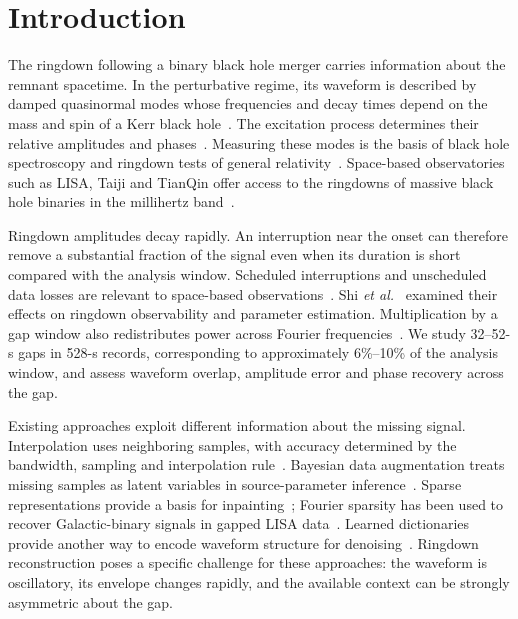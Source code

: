 \documentclass[10pt,prd,aps,a4paper,twocolumn,superscriptaddress,nofootinbib,floatfix]{revtex4-2}
\begin{document}
\section{Introduction}
The ringdown following a binary black hole merger carries information about the remnant spacetime. In the perturbative regime, its waveform is described by damped quasinormal modes whose frequencies and decay times depend on the mass and spin of a Kerr black hole~\cite{berti2006gravitational,berti2009qnm}. The excitation process determines their relative amplitudes and phases~\cite{Zhang2013Excitation}. Measuring these modes is the basis of black hole spectroscopy and ringdown tests of general relativity~\cite{Isi_2019}. Space-based observatories such as LISA, Taiji and TianQin offer access to the ringdowns of massive black hole binaries in the millihertz band~\cite{amaroseoane2017laserinterferometerspaceantenna,robson2019construction,Ruan2020,Luo2016}.

Ringdown amplitudes decay rapidly. An interruption near the onset can therefore remove a substantial fraction of the signal even when its duration is short compared with the analysis window. Scheduled interruptions and unscheduled data losses are relevant to space-based observations~\cite{Baghi2019,dey2021gaps}. Shi \textit{et al.}~\cite{shi2024effectsdatagapsringdown} examined their effects on ringdown observability and parameter estimation. Multiplication by a gap window also redistributes power across Fourier frequencies~\cite{Harris1978}. We study 32--52-s gaps in 528-s records, corresponding to approximately 6\%--10\% of the analysis window, and assess waveform overlap, amplitude error and phase recovery across the gap.

Existing approaches exploit different information about the missing signal. Interpolation uses neighboring samples, with accuracy determined by the bandwidth, sampling and interpolation rule~\cite{Horowitz1974,Maeland1988,Unser1999}. Bayesian data augmentation treats missing samples as latent variables in source-parameter inference~\cite{Baghi2019}. Sparse representations provide a basis for inpainting~\cite{Starck2010}; Fourier sparsity has been used to recover Galactic-binary signals in gapped LISA data~\cite{Blelly2021}. Learned dictionaries provide another way to encode waveform structure for denoising~\cite{TorresForne2016}. Ringdown reconstruction poses a specific challenge for these approaches: the waveform is oscillatory, its envelope changes rapidly, and the available context can be strongly asymmetric about the gap.
\end{document}
